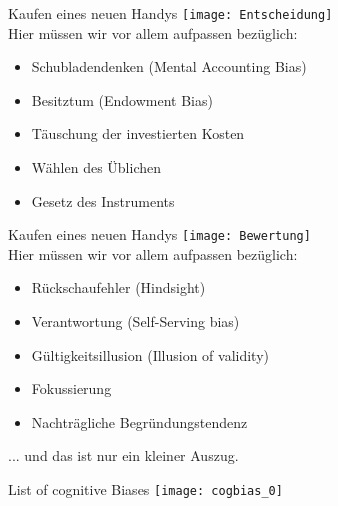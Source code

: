 \begin{frame}[c]{Kaufen eines neuen Handys}
    \texttt{[image: Entscheidung]} \\
    \pause
    Hier müssen wir vor allem aufpassen bezüglich:
    \begin{itemize}[<+(1)->]
        \item Schubladendenken (Mental Accounting Bias)
        \item Besitztum (Endowment Bias)
        \item Täuschung der investierten Kosten
        \item Wählen des Üblichen
        \item Gesetz des Instruments
    \end{itemize}
\end{frame}


\begin{frame}[c]{Kaufen eines neuen Handys}
    \texttt{[image: Bewertung]} \\
    \pause
    Hier müssen wir vor allem aufpassen bezüglich:
    \begin{itemize}[<+(1)->]
        \item Rückschaufehler (Hindsight)
        \item Verantwortung (Self-Serving bias)
        \item Gültigkeitsillusion (Illusion of validity)
        \item Fokussierung
        \item Nachträgliche Begründungstendenz
    \end{itemize}
\end{frame}




\begin{frame}[standout]
    ... und das ist nur ein kleiner Auszug.
\end{frame}

\begin{frame}[c]{List of cognitive Biases}
    \centering
    \texttt{[image: cogbias\_0]}
\end{frame}

% 
% 
